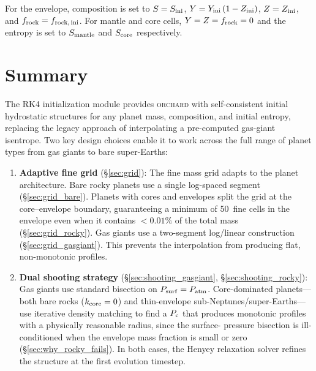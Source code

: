 \documentclass{aastex631}
\newcommand{\Pc}{P_{\rm c}}
\newcommand{\Patm}{P_{\rm atm}}
\newcommand{\Psurf}{P_{\rm surf}}
\newcommand{\orchard}{\textsc{orchard}}
\begin{document}
For the envelope, composition is set to $S = S_{\rm ini}$, $Y = Y_{\rm
ini}\,(1 - Z_{\rm ini})$, $Z = Z_{\rm ini}$, and $f_{\rm rock} =
f_{\rm rock,\,ini}$.  For mantle and core cells, $Y = Z = f_{\rm rock}
= 0$ and the entropy is set to $S_{\rm mantle}$ and $S_{\rm core}$
respectively.

\section{Summary}\label{sec:summary}

The RK4 initialization module provides \orchard{} with self-consistent
initial hydrostatic structures for any planet mass, composition, and
initial entropy, replacing the legacy approach of interpolating a
pre-computed gas-giant isentrope.  Two key design choices enable it to
work across the full range of planet types from gas giants to bare
super-Earths:

\begin{enumerate}
  \item \textbf{Adaptive fine grid} (\S\ref{sec:grid}): The fine mass
    grid adapts to the planet architecture.  Bare rocky planets use a
    single log-spaced segment (\S\ref{sec:grid_bare}).  Planets with
    cores and envelopes split the grid at the core--envelope boundary,
    guaranteeing a minimum of 50~fine cells in the envelope even when
    it contains $< 0.01\%$ of the total mass
    (\S\ref{sec:grid_rocky}).  Gas giants use a two-segment log/linear
    construction (\S\ref{sec:grid_gasgiant}).  This prevents the
    interpolation from producing flat, non-monotonic profiles.

  \item \textbf{Dual shooting strategy} (\S\ref{sec:shooting_gasgiant},
    \S\ref{sec:shooting_rocky}): Gas giants use standard bisection on
    $\Psurf = \Patm$.  Core-dominated planets---both bare rocks
    ($k_{\rm core} = 0$) and thin-envelope sub-Neptunes/super-Earths---use
    iterative density matching to find a $\Pc$ that produces monotonic
    profiles with a physically reasonable radius, since the surface-%
    pressure bisection is ill-conditioned when the envelope mass fraction
    is small or zero (\S\ref{sec:why_rocky_fails}).  In both cases, the
    Henyey relaxation solver refines the structure at the first evolution
    timestep.
\end{enumerate}
\end{document}
